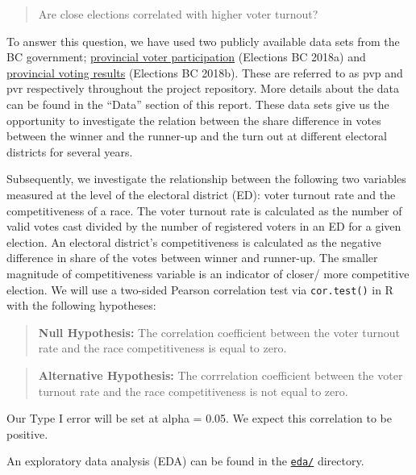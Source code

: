 \documentclass[
]{article}
\begin{document}
\begin{quote}
Are close elections correlated with higher voter turnout?
\end{quote}

To answer this question, we have used two publicly available data sets
from the BC government;
\href{https://catalogue.data.gov.bc.ca/dataset/6d9db663-8c30-43ec-922b-d541d22e634f/resource/646530d4-078c-4815-8452-c75639962bb4}{provincial
voter participation} (Elections BC 2018a) and
\href{https://catalogue.data.gov.bc.ca/dataset/44914a35-de9a-4830-ac48-870001ef8935/resource/fb40239e-b718-4a79-b18f-7a62139d9792}{provincial
voting results} (Elections BC 2018b). These are referred to as pvp and
pvr respectively throughout the project repository. More details about
the data can be found in the ``Data'' section of this report. These data
sets give us the opportunity to investigate the relation between the
share difference in votes between the winner and the runner-up and the
turn out at different electoral districts for several years.

Subsequently, we investigate the relationship between the following two
variables measured at the level of the electoral district (ED): voter
turnout rate and the competitiveness of a race. The voter turnout rate
is calculated as the number of valid votes cast divided by the number of
registered voters in an ED for a given election. An electoral district's
competitiveness is calculated as the negative difference in share of the
votes between winner and runner-up. The smaller magnitude of
competitiveness variable is an indicator of closer/ more competitive
election. We will use a two-sided Pearson correlation test via
\texttt{cor.test()} in R with the following hypotheses:

\begin{quote}
\textbf{Null Hypothesis:} The correlation coefficient between the voter
turnout rate and the race competitiveness is equal to zero.
\end{quote}

\begin{quote}
\textbf{Alternative Hypothesis:} The corrrelation coefficient between
the voter turnout rate and the race competitiveness is not equal to
zero.
\end{quote}

Our Type I error will be set at alpha = 0.05. We expect this correlation
to be positive.

An exploratory data analysis (EDA) can be found in the
\href{https://github.com/UBC-MDS/bc_election_turnout/tree/main/eda}{\texttt{eda/}}
directory.
\end{document}
